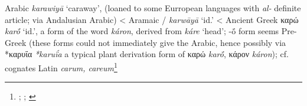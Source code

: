 \begin{etymology}\label{ety:karawiya}
Arabic \textit{karawiyā} `caraway', (loaned to some Eurropean languages with \textit{al-} definite article; via Andalusian Arabic)
< Aramaic {/} \textit{karwāyā} `id.'
< Ancient Greek {καρώ} \textit{karṓ} `id.', a form of the word \textit{káron}, derived from \textit{káre} `head'; -ṓ form seems Pre-Greek (these forms could not immediately give the Arabic, hence possibly via *καρυΐα \textit{*karuḯa} a typical plant derivation form of καρώ \textit{karṓ}, κάρον \textit{káron}); cf. cognates Latin \textit{carum, careum}\footnote{\textcite[74]{corriente_dictionary_2008}; \textcites[207]{low_aramaeische_1881}[437-438]{low_flora_1924}; \textcites[653]{beekes_etymological_2010}[599]{sokoloff_dictionary_2002}}
\end{etymology}